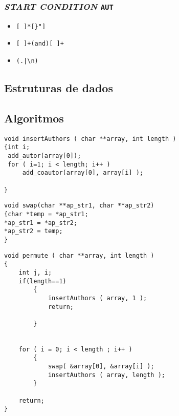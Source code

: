 \subsubsection{\emph{START CONDITION} \texttt{AUT}}

\begin{itemize}
	\item 

\begin{verbatim}
[ ]*[}"] 
\end{verbatim}

\item 
\begin{verbatim}
[ ]+(and)[ ]+
\end{verbatim}

\item 
\begin{verbatim}
(.|\n)
\end{verbatim}


\end{itemize}

\subsection{Estruturas de dados}

\subsection{Algoritmos}


\begin{Verbatim}
void insertAuthors ( char **array, int length )
{int i;
 add_autor(array[0]);
 for ( i=1; i < length; i++ )
     add_coautor(array[0], array[i] );
 				
}
\end{Verbatim}


\begin{Verbatim}
void swap(char **ap_str1, char **ap_str2)
{char *temp = *ap_str1;
*ap_str1 = *ap_str2;
*ap_str2 = temp;
}
\end{Verbatim}


\begin{Verbatim}
void permute ( char **array, int length )
{
    int j, i;
    if(length==1)
        {
            insertAuthors ( array, 1 );
            return;

        }


    for ( i = 0; i < length ; i++ )
        {
            swap( &array[0], &array[i] );
            insertAuthors ( array, length );
        }

    return;
}
\end{Verbatim}


